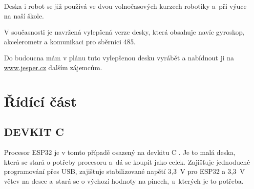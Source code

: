 \documentclass{template/socthesis}
\begin{document}
Deska i robot se již používá ve dvou volnočasových kurzech robotiky a~při výuce na naší škole. 

\vspace{0.5\baselineskip} %
V současnosti je navržená vylepšená verze desky, která obsahuje navíc gyroskop, akcelerometr a komunikaci pro sběrnici 485. 


\vspace{0.5\baselineskip} %
Do budoucna mám v plánu tuto vylepšenou desku vyrábět a  nabídnout
ji na \url{www.jesper.cz} dalším zájemcům. 
 


\appendix
{}
	

\chapter{Řídící část}
	\label{RB3202l}
	\section{DEVKIT C}
	Procesor ESP32 je v tomto případě osazený na devkitu C \cite{DevKitC}.
	Je to malá deska, která se stará o potřeby procesoru a~dá se koupit jako celek. Zajišťuje jednoduché programování přes USB, zajištuje stabilizované napětí 3,3~V pro ESP32 a 3,3~V větev na desce a~stará se o výchozí hodnoty na pinech, u~kterých je to potřeba.
	
\end{document}
